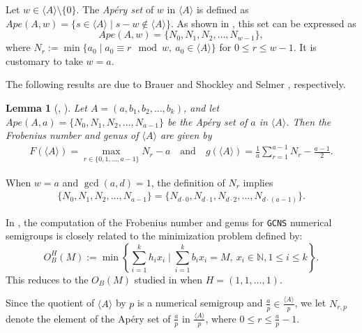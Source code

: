 \documentclass[reqno, 12pt]{article}
\newtheorem{lem}[thm]{Lemma}
\theoremstyle{mydefinition}
\theoremstyle{myremark}
\numberwithin{algorithm}{section}
\begin{document}
Let $w \in \langle A\rangle \setminus \{0\}$.
The \emph{Ap\'ery set} of $w$ in $\langle A\rangle$ is defined as $Ape(A,w)=\{s\in \langle A\rangle \mid s-w\notin \langle A\rangle\}$. As shown in \cite{J.C.Rosales}, this set can be expressed as
$$Ape(A,w)=\{N_0,N_1,N_2,\ldots,N_{w-1}\},$$
where $N_r:=\min\{ a_0\mid a_0\equiv r\mod w, \ a_0\in \langle A\rangle\}$ for $0\leq r\leq w-1$. It is customary to take $w = a$.

The following results are due to Brauer and Shockley \cite{J. E. Shockley} and Selmer \cite{E. S. Selmer}, respectively.
\begin{lem}[\cite{J. E. Shockley}, \cite{E. S. Selmer}]\label{LiuXin001}
Let $A=(a, b_1, b_2, \ldots, b_k)$, and let $Ape(A,a)=\{N_0,N_1,N_2,\ldots,N_{a-1}\}$ be the Apéry set of $a$ in $\langle A \rangle$.
Then the Frobenius number and genus of $\langle A\rangle$ are given by
\begin{align*}
F(\langle A\rangle)=\max_{r\in \lbrace 0, 1, \ldots, a-1\rbrace}N_r -a\quad \text{and} \quad 
g(\langle A\rangle)=\frac{1}{a}\sum_{r=1}^{a-1}N_r-\frac{a-1}{2}.
\end{align*}
\end{lem}

When $w=a$ and $\gcd(a,d)=1$, the definition of $N_r$ implies
\begin{align*}
\{N_0, N_1, N_2,\ldots, N_{a-1}\}=\{N_{d\cdot 0}, N_{d\cdot 1}, N_{d\cdot 2},\ldots, N_{d\cdot (a-1)}\}.
\end{align*}

In \cite{LiuSemigroupF}, the computation of the Frobenius number and genus for \texttt{GCNS} numerical semigroups 
is closely related to the minimization problem defined by:
$$O_{B}^{H}(M):=\min\left\{\sum_{i=1}^kh_ix_i \mid \sum_{i=1}^k b_ix_i=M, \ x_i\in\mathbb{N}, 1\leq i\leq k\right\}.$$
This reduces to the $O_B(M)$ studied in \cite{Liu-Xin} when $H=(1,1,\dots,1)$.


Since the quotient of $\langle A\rangle$ by $p$ is a numerical semigroup and $\frac{a}{p} \in \frac{\langle A\rangle}{p}$, we let $N_{r,p}$ denote the element of the Ap\'ery set of $\frac{a}{p}$ in $\frac{\langle A\rangle}{p}$, where $0 \leq r \leq \frac{a}{p}-1$.
\end{document}
